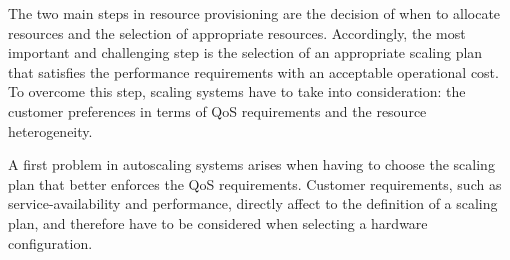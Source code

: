 
The two main steps in resource provisioning are the decision of when to allocate resources and the selection of appropriate resources.
Accordingly, the most important and challenging step is the selection of an appropriate scaling plan that satisfies the performance requirements with an acceptable operational cost. 
To overcome this step, scaling systems have to take into consideration: the customer preferences in terms of QoS requirements and the resource heterogeneity.

A first problem in autoscaling systems arises when having to choose the scaling plan that better enforces the QoS requirements. Customer requirements, such as service-availability and performance, directly affect to the definition of a scaling plan, and therefore have to be considered when selecting a hardware configuration.



